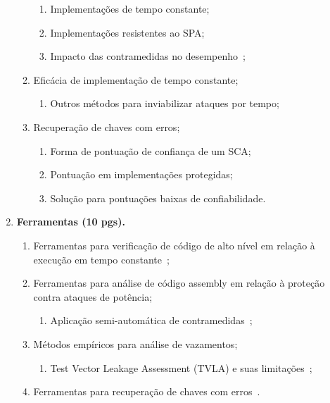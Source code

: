 \documentclass[12pt]{article}
\begin{document}
\begin{enumerate}
\begin{enumerate}
\begin{enumerate}
            \item Implementa\c{c}\~oes de tempo constante;
            \item Implementa\c{c}\~oes resistentes ao SPA;
            \item Impacto das contramedidas no desempenho~\cite{coron1999resistance,danger2013synthesis};
        \end{enumerate}
        \item Efic\'acia de implementa\c{c}\~ao de tempo constante;
        \begin{enumerate}
            \item Outros métodos para inviabilizar ataques por tempo;
        \end{enumerate}
        \item Recuperação de chaves com erros; ~\cite{VeyratCharvillon2013,LangeVrendendaalWakker2014}
        \begin{enumerate}
            \item Forma de pontua\c{c}\~ao de confiança de um SCA;
            \item Pontua\c{c}\~ao em implementa\c{c}\~oes protegidas;
            \item Solu\c{c}\~ao para pontua\c{c}\~oes baixas de confiabilidade.
        \end{enumerate}
    \end{enumerate}
\item \textbf{Ferramentas (10 pgs).}
    \begin{enumerate}
        \item Ferramentas para verifica\c{c}\~ao de c\'odigo de alto n\'ivel em  relação \`a execu\c{c}\~ao em tempo constante~\cite{Langley2012};
        \item Ferramentas para an\'alise de c\'odigo assembly em relação à  prote\c{c}\~ao contra ataques de pot\^encia;
            \begin{enumerate}
                \item Aplica\c{c}\~ao semi-autom\'atica de contramedidas~\cite{MossOswald2012};
            \end{enumerate}
        \item M\'etodos emp\'iricos para an\'alise de vazamentos;
            \begin{enumerate}
                \item Test Vector Leakage Assessment (TVLA) e suas limita\c{c}\~oes~\cite{GoodwillJun2011, WittemanJaffe2013, TunstallGoodwill2016};
            \end{enumerate}
        \item Ferramentas para recuperação de chaves com erros~\cite{VeyratCharvillon2013,LangeVrendendaalWakker2014}.
    \end{enumerate}
\end{enumerate}
\end{document}
